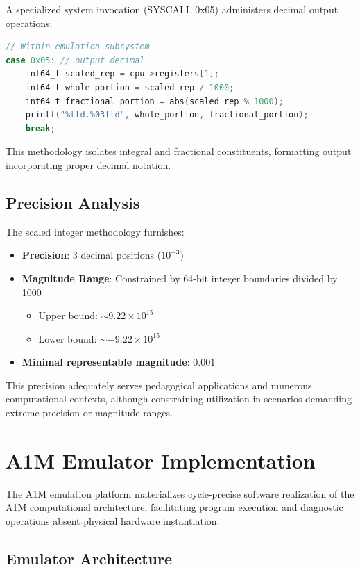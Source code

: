 \documentclass[conference,10pt,twocolumn]{IEEEtran}
\begin{document}
A specialized system invocation (SYSCALL 0x05) administers decimal output operations:

\begin{lstlisting}[language=C, basicstyle=\small\ttfamily]
// Within emulation subsystem
case 0x05: // output_decimal
    int64_t scaled_rep = cpu->registers[1];
    int64_t whole_portion = scaled_rep / 1000;
    int64_t fractional_portion = abs(scaled_rep % 1000);
    printf("%lld.%03lld", whole_portion, fractional_portion);
    break;
\end{lstlisting}

This methodology isolates integral and fractional constituents, formatting output incorporating proper decimal notation.

\subsection{Precision Analysis}

The scaled integer methodology furnishes:

\begin{itemize}
\item \textbf{Precision}: 3 decimal positions ($10^{-3}$)
\item \textbf{Magnitude Range}: Constrained by 64-bit integer boundaries divided by 1000
  \begin{itemize}
  \item Upper bound: $\sim 9.22 \times 10^{15}$
  \item Lower bound: $\sim -9.22 \times 10^{15}$
  \end{itemize}
\item \textbf{Minimal representable magnitude}: $0.001$
\end{itemize}

This precision adequately serves pedagogical applications and numerous computational contexts, although constraining utilization in scenarios demanding extreme precision or magnitude ranges.

\section{A1M Emulator Implementation}

The A1M emulation platform materializes cycle-precise software realization of the A1M computational architecture, facilitating program execution and diagnostic operations absent physical hardware instantiation.

\subsection{Emulator Architecture}
\end{document}

